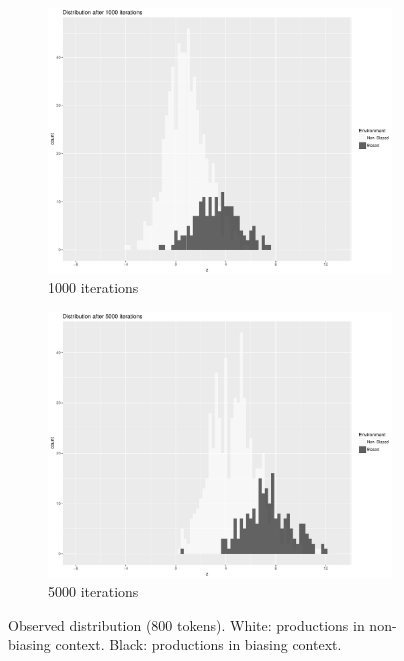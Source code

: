 \begin{figure}[H]

\begin{subfigure}[t]{.45\textwidth}
        \includegraphics[width=\linewidth]{figures/1000iter.pdf}
        \caption{1000 iterations}
    \end{subfigure}\hfill
    \begin{subfigure}[t]{.45\textwidth}
        \includegraphics[width=\linewidth]{figures/5000iter.pdf}
        \caption{5000 iterations}
    \end{subfigure}
    

\caption{\label{fig:End context mismatch}Observed distribution (800 tokens).
White: productions in non-biasing context. Black: productions in biasing
context.}
\end{figure}

